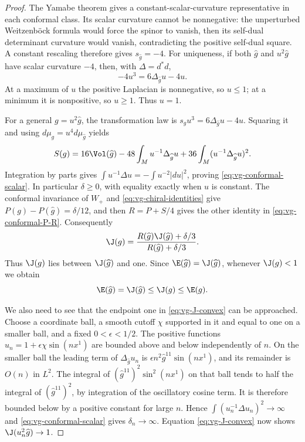 \begin{proof}
The Yamabe theorem \cite{LeeParker1987} gives a constant-scalar-curvature representative in
each conformal class.  Its scalar curvature cannot be nonnegative:
the unperturbed Weitzenb\"ock formula would force the spinor to vanish,
then its self-dual determinant curvature would vanish, contradicting
the positive self-dual square.  A constant rescaling therefore gives
$s_{\widehat g}=-4$.  For uniqueness, if both $\widehat g$ and
$u^2\widehat g$ have scalar curvature $-4$, then, with
$\Delta=d^*d$,
\begin{equation}\label{eq:vg-conformal-scalar-law}
 -4u^3=6\Delta_{\widehat g}u-4u.
\end{equation}
At a maximum of $u$ the positive Laplacian is nonnegative, so $u\leq1$;
at a minimum it is nonpositive, so $u\geq1$.  Thus $u=1$.

For a general $g=u^2\widehat g$, the transformation law is
$s_gu^3=6\Delta_{\widehat g}u-4u$.  Squaring it and using
$d\mu_g=u^4d\mu_{\widehat g}$ yields
\[
 S(g)=16\Vol(\widehat g)-48\int_Mu^{-1}\Delta_{\widehat g}u
                   +36\int_M(u^{-1}\Delta_{\widehat g}u)^2.
\]
Integration by parts gives
$\int u^{-1}\Delta u=-\int u^{-2}|du|^2$, proving
\eqref{eq:vg-conformal-scalar}.  In particular $\delta\geq0$, with
equality exactly when $u$ is constant.  The conformal invariance of
$W_+$ and \eqref{eq:vg-chiral-identities} give
$P(g)-P(\widehat g)=\delta/12$, and then $R=P+S/4$ gives the other
identity in \eqref{eq:vg-conformal-P-R}.  Consequently
\begin{equation}\label{eq:vg-J-convex}
 \J(g)=\frac{R(\widehat g)\J(\widehat g)+\delta/3}
                   {R(\widehat g)+\delta/3}.
\end{equation}
Thus $\J(g)$ lies between $\J(\widehat g)$ and one.  Since
$\E(\widehat g)=\J(\widehat g)$, whenever $\J(g)<1$ we obtain
\begin{equation}\label{eq:vg-Yamabe-improves}
 \E(\widehat g)=\J(\widehat g)\leq\J(g)\leq\E(g).
\end{equation}

We also need to see that the endpoint one in
\eqref{eq:vg-J-convex} can be approached.  Choose a coordinate ball,
a smooth cutoff $\chi$ supported in it and equal to one on a smaller
ball, and a fixed $0<\epsilon<1/2$.  The positive functions
$u_n=1+\epsilon\chi\sin(nx^1)$ are bounded above and below independently
of $n$.  On the smaller ball the leading term of
$\Delta_{\widehat g}u_n$ is
$\epsilon n^2\widehat g^{11}\sin(nx^1)$, and its remainder is $O(n)$
in $L^2$.  The integral of
$(\widehat g^{11})^2\sin^2(nx^1)$ on that ball tends to half the
integral of $(\widehat g^{11})^2$, by integration of the oscillatory
cosine term.  It is therefore bounded below by a positive constant for
large $n$.  Hence
$\int(u_n^{-1}\Delta u_n)^2\to\infty$ and \eqref{eq:vg-conformal-scalar}
gives $\delta_n\to\infty$.  Equation \eqref{eq:vg-J-convex} now shows
$\J(u_n^2\widehat g)\to1$.


\end{proof}
